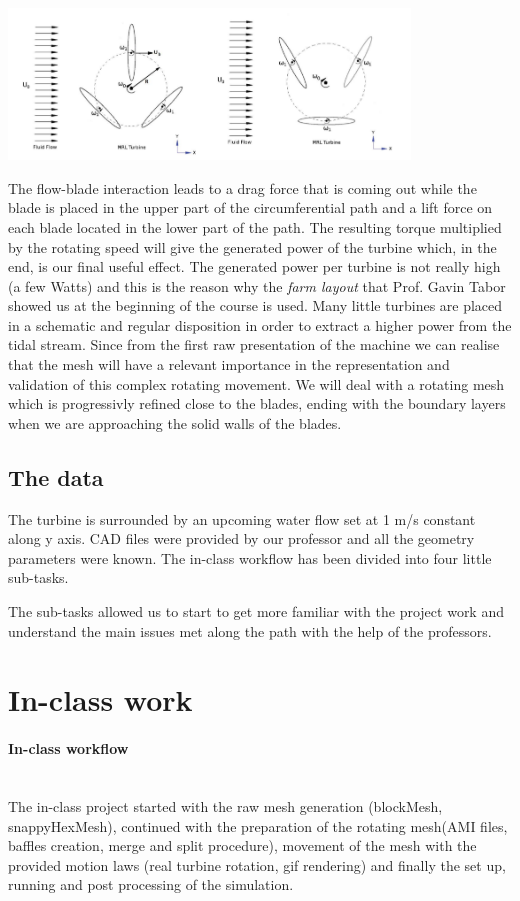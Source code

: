 \documentclass[a4paper,12pt]{article}
\begin{document}
\begin{center}
\includegraphics[width=0.8\textwidth]{images/flow.png} 
\end{center}

The flow-blade interaction leads to a drag force that is coming out while the blade is placed in the upper part of the circumferential path and a lift force on each blade located in the lower part of the path.
The resulting torque multiplied by the rotating speed will give the generated power of the turbine which, in the end, is our final useful effect. The generated power per turbine is not really high (a few Watts) and this is the reason why the \emph{farm layout}  that Prof. Gavin Tabor showed us at the beginning of the course is used. Many little turbines are placed in a schematic and regular disposition in order to extract a higher power from the tidal stream.
Since from the first raw presentation of the machine we can realise that the mesh will have a relevant importance in the representation and validation of this complex rotating movement. We will deal with a rotating mesh which is progressivly refined close to the blades, ending with the boundary layers when we are approaching the solid walls of the blades.


\subsection{The data}
The turbine is surrounded by an upcoming water flow set at 1 m/s constant along y axis. 
CAD files were provided by our professor and all the geometry parameters were known.
The in-class workflow has been divided into four little sub-tasks. 

The sub-tasks allowed us to start to get more familiar with the project work and understand the main issues met along the path with the help of the professors.

\section{In-class work}
\paragraph{In-class workflow}\mbox{}\\
 The in-class project started with the raw mesh generation (blockMesh, snappyHexMesh), continued with the preparation of the rotating mesh(AMI files, baffles creation, merge and split procedure), movement of the mesh with the provided motion laws  (real turbine rotation, gif rendering) and finally the set up, running and post processing of the simulation.
\end{document}
